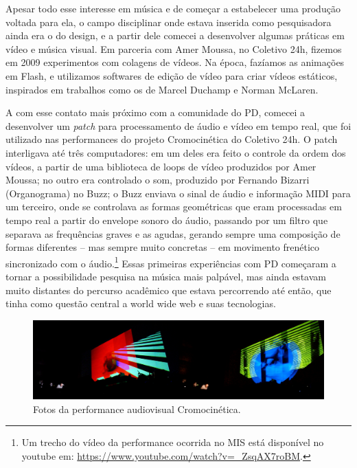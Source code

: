 
Apesar todo esse interesse em música e de começar a estabelecer uma produção voltada para ela, o campo disciplinar onde estava inserida como pesquisadora ainda era o do design, e a partir dele comecei a desenvolver algumas práticas em vídeo e música visual. Em parceria com Amer Moussa, no Coletivo 24h, fizemos em 2009 experimentos com colagens de vídeos. Na época, fazíamos as animações em Flash, e utilizamos softwares de edição de vídeo para criar vídeos estáticos, inspirados em trabalhos como os de Marcel Duchamp e Norman McLaren. 

A com esse contato mais próximo com a comunidade do PD, comecei a desenvolver um \emph{patch} para processamento de áudio e vídeo em tempo real, que foi utilizado nas performances do projeto Cromocinética do Coletivo 24h. O patch interligava até três computadores: em um deles era feito o controle da ordem dos vídeos, a partir de uma biblioteca de loops de vídeo produzidos por Amer Moussa; no outro era controlado o som, produzido por Fernando Bizarri (Organograma) no Buzz; o Buzz enviava o sinal de áudio e informação MIDI para um terceiro, onde se controlava as formas geométricas que eram processadas em tempo real a partir do envelope sonoro do áudio, passando por um filtro que separava as frequências graves e as agudas, gerando sempre uma composição de formas diferentes – mas sempre muito concretas – em movimento frenético sincronizado com o áudio.\footnote{Um trecho do vídeo da performance ocorrida no MIS está disponível no youtube em:  \url{https://www.youtube.com/watch?v=_ZsqAX7roBM}.} Essas primeiras experiências com PD começaram a tornar a possibilidade pesquisa na música mais palpável, mas ainda estavam muito distantes do percurso acadêmico que estava percorrendo até então, que tinha como questão central a world wide web e suas tecnologias.


\begin{figure}

\includegraphics[width=1\textwidth]{pictures/cap1/cromocinetica}
\caption{Fotos da performance audiovisual Cromocinética.}
\label{fig:cromocinetica}
\end{figure}

